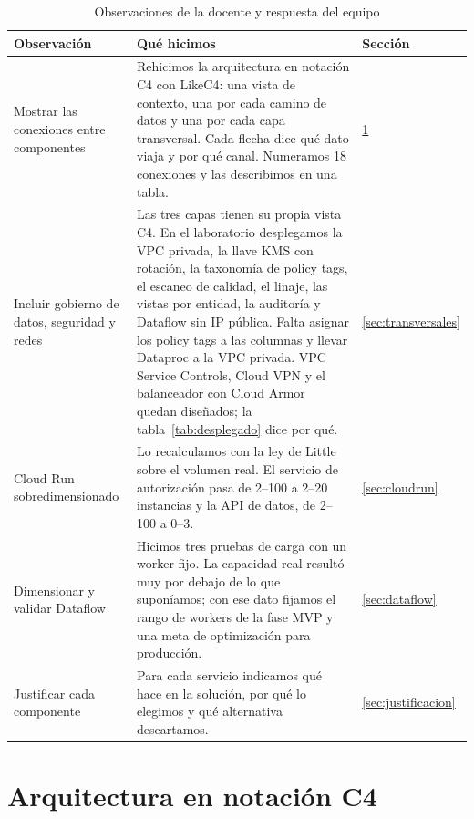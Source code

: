 \documentclass[11pt,a4paper]{article}
\begin{document}
\begin{table}[H]
\centering\small
\caption{Observaciones de la docente y respuesta del equipo}
\label{tab:observaciones}
\begin{tabularx}{\linewidth}{P{3.6cm}LP{1.6cm}}
\toprule
\textbf{Observación} & \textbf{Qué hicimos} & \textbf{Sección}\\
\midrule
Mostrar las conexiones entre componentes & Rehicimos la arquitectura en notación C4 con LikeC4: una vista de contexto, una por cada camino de datos y una por cada capa transversal. Cada flecha dice qué dato viaja y por qué canal. Numeramos 18 conexiones y las describimos en una tabla. & \ref{sec:arquitectura}\\
 Incluir gobierno de datos, seguridad y redes & Las tres capas tienen su propia vista C4. En el laboratorio desplegamos la VPC privada, la llave KMS con rotación, la taxonomía de policy tags, el escaneo de calidad, el linaje, las vistas por entidad, la auditoría y Dataflow sin IP pública. Falta asignar los policy tags a las columnas y llevar Dataproc a la VPC privada. VPC Service Controls, Cloud VPN y el balanceador con Cloud Armor quedan diseñados; la tabla~\ref{tab:desplegado} dice por qué. & \ref{sec:transversales}\\
Cloud Run sobredimensionado & Lo recalculamos con la ley de Little sobre el volumen real. El servicio de autorización pasa de 2–100 a 2–20 instancias y la API de datos, de 2–100 a 0–3. & \ref{sec:cloudrun}\\
 Dimensionar y validar Dataflow & Hicimos tres pruebas de carga con un worker fijo. La capacidad real resultó muy por debajo de lo que suponíamos; con ese dato fijamos el rango de workers de la fase MVP y una meta de optimización para producción. & \ref{sec:dataflow}\\
Justificar cada componente & Para cada servicio indicamos qué hace en la solución, por qué lo elegimos y qué alternativa descartamos. & \ref{sec:justificacion}\\
\bottomrule
\end{tabularx}
\end{table}

\FloatBarrier

\section{Arquitectura en notación C4}\label{sec:arquitectura}
\end{document}

